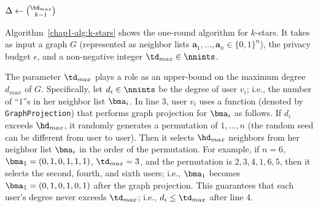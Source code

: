 \begin{algorithm}
  \SetAlgoLined
  $\Delta \leftarrow \binom{\td_{max}}{k-1}$\;
  \caption{\label{chap1-alg:k-stars}}
\end{algorithm}

Algorithm~\ref{chap1-alg:k-stars} shows the one-round algorithm for $k$-stars. 
It takes as input a graph $G$ (represented as neighbor lists $\textbf{a}_1, \ldots, \textbf{a}_n \in \{0,1\}^n$), the privacy budget $\epsilon$, and a non-negative integer $\td_{max} \in \nnints$. 

The parameter $\td_{max}$ plays a role as an upper-bound on the maximum degree $d_{max}$ of $G$. 
Specifically, let $d_i \in \nnints$ be the degree of user $v_i$; i.e., the number of ``$1$''s in her neighbor list $\bma_i$. 
In line 3, user $v_i$
uses a function (denoted by \texttt{GraphProjection}) that performs graph projection \cite{Day_SIGMOD16,Kasiviswanathan_TCC13,Raskhodnikova_arXiv15} for $\bma_i$ as follows. 
If $d_i$ exceeds $\hd_{max}$, it randomly generates a permutation of $1,\ldots,n$ (the random seed can be different from user to user). 
Then it selects $\hd_{max}$ neighbors from her neighbor list $\bma_i$ in the order of the permutation.
For example, if $n=6$, $\bma_1=(0,1,0,1,1,1)$, $\td_{max}=3$, and the permutation is $2,3,4,1,6,5$, then 
it selects the second, fourth, and sixth users; i.e., $\bma_1$ becomes $\bma_1=(0,1,0,1,0,1)$ after the graph projection. 
This guarantees that each user's degree never exceeds $\td_{max}$; i.e., $d_i \leq \td_{max}$ after line 4. 

